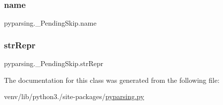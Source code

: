 \subsubsection{\texorpdfstring{name}{name}}
{\footnotesize\ttfamily pyparsing.\+\_\+\+Pending\+Skip.\+name}

\mbox{\label{classpyparsing_1_1__PendingSkip_a782b316aac786f7ebaf348e08f11f080}} 
\subsubsection{\texorpdfstring{str\+Repr}{strRepr}}
{\footnotesize\ttfamily pyparsing.\+\_\+\+Pending\+Skip.\+str\+Repr}



The documentation for this class was generated from the following file\+:\begin{DoxyCompactItemize}
\item 
venv/lib/python3./site-\/packages/\hyperlink{pyparsing_8py}{pyparsing.\+py}\end{DoxyCompactItemize}
